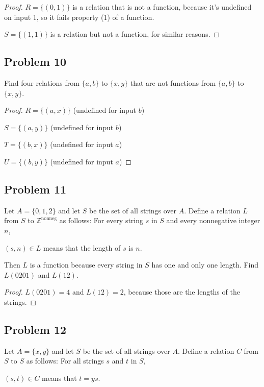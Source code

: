 \documentclass[14pt]{extarticle}
\newcommand{\Z}{\mathbb{Z}}
\begin{document}
\begin{proof}
$R = \{(0, 1)\}$ is a relation that is not a function, because it's undefined
on input 1, so it fails property (1) of a function.

$S = \{(1, 1)\}$ is a relation but not a function, for similar reasons.
\end{proof}

\subsection{Problem 10}
Find four relations from $\{a, b\}$ to $\{x, y\}$ that are not functions from
$\{a, b\}$ to $\{x, y\}$.

\begin{proof}
$R = \{(a, x)\}$ (undefined for input $b$)

$S = \{(a, y)\}$ (undefined for input $b$)

$T = \{(b, x)\}$ (undefined for input $a$)

$U = \{(b, y)\}$ (undefined for input $a$)
\end{proof}

\subsection{Problem 11}
Let $A = \{0, 1, 2\}$ and let $S$ be the set of all strings over $A$.
Define a relation $L$ from $S$ to $\Z^{\text{nonneg}}$ as follows:
For every string $s$ in $S$ and every nonnegative integer $n$,

\begin{center}
$(s, n) \in L$ means that the length of $s$ is $n$.
\end{center}

Then $L$ is a function because every string in $S$ has one and only one length.
Find $L(0201)$ and $L(12)$.

\begin{proof}
$L(0201) = 4$ and $L(12) = 2$, because those are the lengths of the strings.
\end{proof}

\subsection{Problem 12}
Let $A = \{x, y\}$ and let $S$ be the set of all strings over $A$. Define
a relation $C$ from $S$ to $S$ as follows: For all strings $s$ and $t$ in $S$,

\begin{center}
$(s, t) \in C$ means that $t = ys$.
\end{center}
\end{document}
